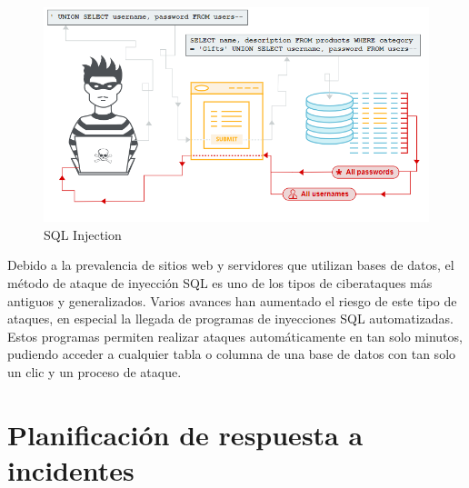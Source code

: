 \begin{figure}[tphb]
  		   \centering
     		   \includegraphics[width=5in]{sqli.png}
  		   \caption{SQL Injection}
  		   \label{img:sqli}
\end{figure}

Debido a la prevalencia de sitios web y servidores que utilizan bases de datos, el método de ataque de inyección SQL es uno de los tipos de ciberataques más antiguos 
y generalizados. Varios avances han aumentado el riesgo de este tipo de ataques, en especial la llegada de programas de inyecciones SQL automatizadas. Estos 
programas permiten realizar ataques automáticamente en tan solo minutos, pudiendo acceder a cualquier tabla o columna de una base de datos con tan solo un clic 
y un proceso de ataque.


\chapter{Planificación de respuesta a incidentes}
\label{cha:planificacion-de-respuesta}


